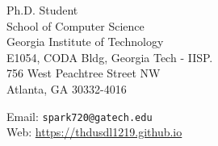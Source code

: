 \begin{minipage}[t]{0.45\textwidth}
  Ph.D. Student\\
  School of Computer Science\\
  Georgia Institute of Technology\\
  E1054, CODA Bldg, Georgia Tech - IISP.\\
  756 West Peachtree Street NW\\
  Atlanta, GA 30332-4016
\end{minipage}
\begin{minipage}[t]{0.45\textwidth}
  Email: \texttt{spark720@gatech.edu} \\
  Web: \url{https://thdusdl1219.github.io} \\
\end{minipage}
